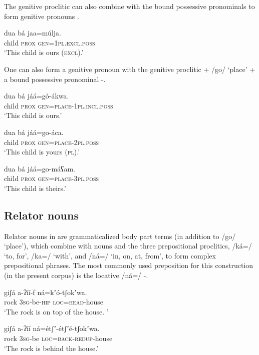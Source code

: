\documentclass[output=paper]{langsci/langscibook}
\begin{document}
The genitive proclitic can also combine with the bound possessive pronominals to form genitive pronouns .

\ea\label{ex:ahlandc:59}
\gll
dua  bá  jaa=m\'{u}lja. \\
child  \textsc{prox} \textsc{gen=1pl.excl.poss}  \\
\glt
‘This child is ours (\textsc{excl}).’
\z

One can also form a genitive pronoun with the genitive proclitic + /go/ ‘place’ + a bound possessive pronominal -.

\ea\label{ex:ahlandc:60}
\gll
dua   bá       jáá=g\'{o}-ákwa. \\
child \textsc{prox}  \textsc{gen}\textsc{=place-1pl.incl.poss} \\
\glt
‘This child is ours.’
\z

\ea\label{ex:ahlandc:61}
\gll 
dua   bá       jáá=go-áca. \\
child \textsc{prox} \textsc{gen}\textsc{=place-2pl.poss} \\
\glt
‘This child is yours (\textsc{pl}).’
\z

\ea\label{ex:ahlandc:62}
\gll
dua   bá       jáá=go-máʕam. \\
child \textsc{prox} \textsc{gen}\textsc{=place-3pl.poss}  \\
\glt
‘This child is theirs.’
\z

\subsection{Relator nouns}\label{sec:ahlandc:10.2}

Relator nouns in  are grammaticalized body part terms (in addition to /go/ ‘place’), which combine with nouns and the three prepositional proclitics, /ká=/ ‘to, for’, /ka=/ ‘with’, and /ná=/ ‘in, on, at, from’, to form complex prepositional phrases. The most commonly used preposition for this construction (in the present corpus) is the locative /ná=/ -. 

\ea\label{ex:ahlandc:63}
\gll
giʃá  a-ʔíí-f    ná=kʼ\'{o}-tʃokʼwa. \\
rock \textsc{3sg}{}-be-\textsc{hip}  \textsc{loc}\textsc{=head}{}-house \\
\glt
‘The rock is on top of the house. ’
\z

\ea\label{ex:ahlandc:64}
\gll
giʃá  a-ʔíí    ná=étʃʼ-étʃʼé-tʃokʼwa. \\
rock   3\textsc{sg}{}-be    \textsc{loc}=\textsc{back}{}-\textsc{redup}{}-house \\
\glt
‘The rock is behind the house.’
\z
\end{document}
